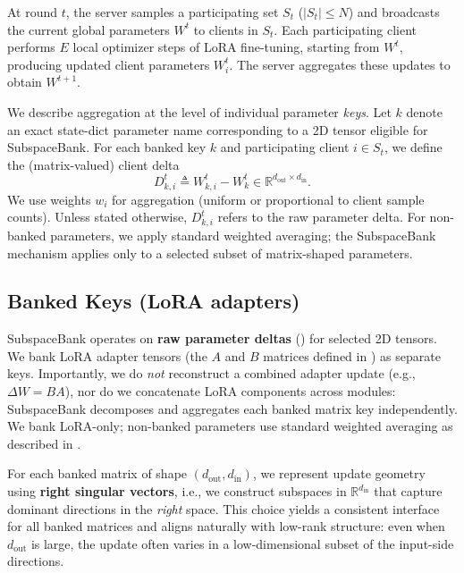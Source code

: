 \documentclass{article}
\theoremstyle{plain}
\theoremstyle{definition}
\theoremstyle{remark}
\begin{document}
At round $t$, the server samples a participating set $S_t$ ($|S_t|\leq N$) and broadcasts the current global parameters $W^t$ to clients in $S_t$. Each participating client performs $E$ local optimizer steps of LoRA fine-tuning, starting from $W^t$, producing updated client parameters $W_i^t$. The server aggregates these updates to obtain $W^{t+1}$.

We describe aggregation at the level of individual parameter \emph{keys}. Let $k$ denote an exact state-dict parameter name corresponding to a 2D tensor eligible for SubspaceBank. For each banked key $k$ and participating client $i\in S_t$, we define the (matrix-valued) client delta
\begin{equation}
  D_{k,i}^t \triangleq W_{k,i}^t - W_k^t \in \mathbb{R}^{d_{\mathrm{out}}\times d_{\mathrm{in}}}.
  \label{eq:delta_def}
\end{equation}
We use weights $w_i$ for aggregation (uniform or proportional to client sample counts). Unless stated otherwise, $D_{k,i}^t$ refers to the raw parameter delta. For non-banked parameters, we apply standard weighted averaging; the SubspaceBank mechanism applies only to a selected subset of matrix-shaped parameters.

\subsection{Banked Keys (LoRA adapters)}
\label{sec:banked-keys-method}

SubspaceBank operates on \textbf{raw parameter deltas} () for selected 2D tensors. We bank LoRA adapter tensors (the $A$ and $B$ matrices defined in ) as separate keys. Importantly, we do \emph{not} reconstruct a combined adapter update (e.g., $\Delta W = BA$), nor do we concatenate LoRA components across modules: SubspaceBank decomposes and aggregates each banked matrix key independently. We bank LoRA-only; non-banked parameters use standard weighted averaging as described in .

For each banked matrix of shape $(d_{\mathrm{out}}, d_{\mathrm{in}})$, we represent update geometry using \textbf{right singular vectors}, i.e., we construct subspaces in $\mathbb{R}^{d_{\mathrm{in}}}$ that capture dominant directions in the \emph{right} space. This choice yields a consistent interface for all banked matrices and aligns naturally with low-rank structure: even when $d_{\mathrm{out}}$ is large, the update often varies in a low-dimensional subset of the input-side directions. 
\end{document}

